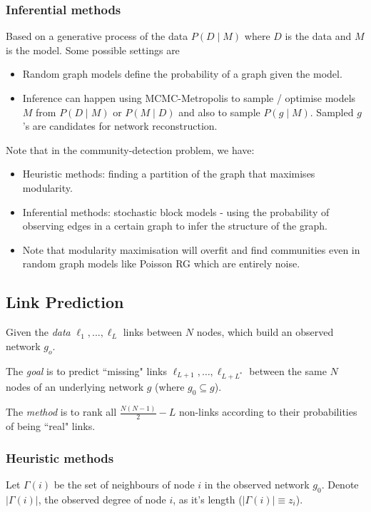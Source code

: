 \documentclass[12pt]{article}
\theoremstyle{definition}
\newcommand{\abs}[1]{\left|{#1}\right|}
\begin{document}
\subsubsection{Inferential methods}
Based on a generative process of the data $P(D\mid M)$ where $D$ is the data and $M$ is the model. Some possible settings are 
\begin{itemize}
    \item Random graph models define the probability of a graph given the model.
    \item Inference can happen using MCMC-Metropolis to sample / optimise models $M$ from $P(D\mid M)$ or $P(M\mid D)$ and also to sample $P(g\mid M)$. Sampled $g$'s are candidates for network reconstruction.
\end{itemize}
Note that in the community-detection problem, we have: 
\begin{itemize}
    \item Heuristic methods: finding a partition of the graph that maximises modularity. 
    \item Inferential methods: stochastic block models - using the probability of observing edges in a certain graph to infer the structure of the graph. 
    \item Note that modularity maximisation will overfit and find communities even in random graph models like Poisson RG which are entirely noise. 
\end{itemize}

\subsection{Link Prediction}

Given the \textit{data} $\ell_1,...,\ell_L$ links between $N$ nodes, which build an observed network $g_o$. 

The \textit{goal} is to predict ``missing" links $\ell_{L+1},\dots, \ell_{L+L^*}$ between the same $N$ nodes of an underlying network $g$ (where $g_0\subseteq g$). 

The \textit{method} is to rank all $\frac{N(N-1)}{2}-L$ non-links according to their probabilities of being ``real" links. 

\subsubsection{Heuristic methods}

Let $\Gamma(i)$ be the set of neighbours of node $i$ in the observed network $g_0$. Denote $|\Gamma(i)|$, the observed degree of node $i$, as it's length ($\abs{\Gamma(i)}\equiv z_i$). 
\end{document}
